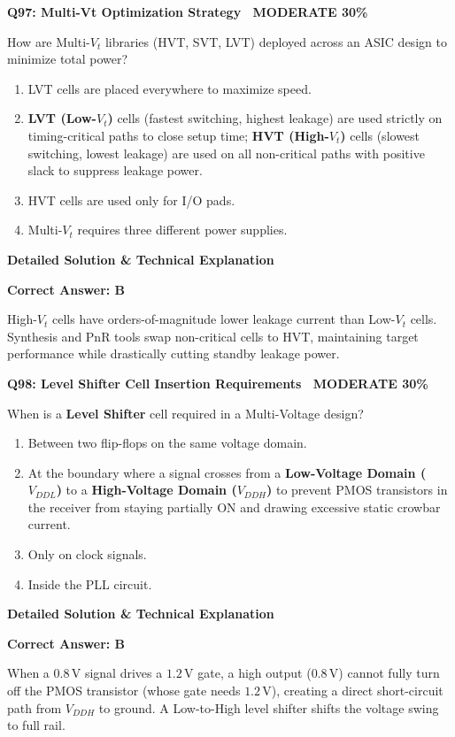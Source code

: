 \documentclass[11pt,a4paper]{article}
\newcommand{\badgemod}{{\color{white}\colorbox{modoran}{\bfseries\sffamily\tiny\ MODERATE 30\%\ }}}
\newenvironment{qbox}[2]{%
  \begin{mdframed}[style=qstyle]%
  {\bfseries\sffamily\color{primaryblue}#1 \hfill #2}\par\vspace{2pt}%
}{%
  \end{mdframed}%
}
\newenvironment{ansbox}{%
  \begin{mdframed}[style=ansstyle]%
  {\bfseries\sffamily\color{ansgreen}\small Detailed Solution \& Technical Explanation}\par\vspace{2pt}\small%
}{%
  \end{mdframed}%
}
\begin{document}
\begin{qbox}{Q97: Multi-Vt Optimization Strategy}{\badgemod}
How are Multi-$V_t$ libraries (HVT, SVT, LVT) deployed across an ASIC design to minimize total power?
\begin{enumerate}[label=\textbf{\Alph*.}]
  \item LVT cells are placed everywhere to maximize speed.
  \item \textbf{LVT (Low-$V_t$)} cells (fastest switching, highest leakage) are used strictly on timing-critical paths to close setup time; \textbf{HVT (High-$V_t$)} cells (slowest switching, lowest leakage) are used on all non-critical paths with positive slack to suppress leakage power.
  \item HVT cells are used only for I/O pads.
  \item Multi-$V_t$ requires three different power supplies.
\end{enumerate}
\end{qbox}
\begin{ansbox}
\textbf{Correct Answer: B}

High-$V_t$ cells have orders-of-magnitude lower leakage current than Low-$V_t$ cells. Synthesis and PnR tools swap non-critical cells to HVT, maintaining target performance while drastically cutting standby leakage power.
\end{ansbox}

\begin{qbox}{Q98: Level Shifter Cell Insertion Requirements}{\badgemod}
When is a \textbf{Level Shifter} cell required in a Multi-Voltage design?
\begin{enumerate}[label=\textbf{\Alph*.}]
  \item Between two flip-flops on the same voltage domain.
  \item At the boundary where a signal crosses from a \textbf{Low-Voltage Domain ($V_{DDL}$)} to a \textbf{High-Voltage Domain ($V_{DDH}$)} to prevent PMOS transistors in the receiver from staying partially ON and drawing excessive static crowbar current.
  \item Only on clock signals.
  \item Inside the PLL circuit.
\end{enumerate}
\end{qbox}
\begin{ansbox}
\textbf{Correct Answer: B}

When a $0.8\,\text{V}$ signal drives a $1.2\,\text{V}$ gate, a high output ($0.8\,\text{V}$) cannot fully turn off the PMOS transistor (whose gate needs $1.2\,\text{V}$), creating a direct short-circuit path from $V_{DDH}$ to ground. A Low-to-High level shifter shifts the voltage swing to full rail.
\end{ansbox}
\end{document}
